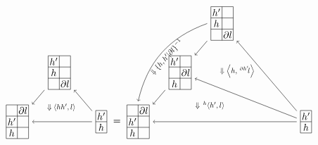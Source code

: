 \documentclass[11pt, reqno]{amsart} %
\newcommand{\act}[1]{\,\sp{#1}\!}
\newcommand{\strsquare}[4][]{
  \begin{scope}[every node/.append style={overlay},#1]
    \foreach \x [count=\i] in {#4}{
      \ifx\x\empty
      \else
        \pgfmathsetmacro{\modResult}{mod(\i-1, #2)}
        \pgfmathsetmacro{\quotResult}{(\i-\modResult-1)/#2}
        \node at (\modResult,-\quotResult) {\x};
      \fi
    }
    \foreach \x in {0,1,...,#2}{
      \draw ({-1/2+\x},{1/2})--({-1/2+\x},{-#3+1/2});
    }
    \foreach \y in {0,1,...,#3}{
      \draw ({-1/2},{1/2-\y})--({#2-1/2},{1/2-\y});
    }
  \end{scope}
}
\theoremstyle{definition}
\theoremstyle{remark}
\numberwithin{equation}{section}
\begin{document}
\[
  \begin{tikzpicture}[baseline=-2pt]
    \node (A) at (1.5,0) {\tikz[baseline=-2pt,scale=.4]{\strsquare{1}{2}{$h'$,$h$}}};
    \node (B) at (0,1.75) {\tikz[baseline=-2pt,scale=.4]{\strsquare{2}{3}{$h'$,,$h$,,,$\partial l$}}};
    \node (C) at (-1.5,0) {\tikz[baseline=-2pt,scale=.4]{\strsquare{2}{3}{,$\partial l$,$h'$,,$h$,}}};
    \draw [->] (A) to (B);
    \draw [->] (B) to (C);
    \draw [->] (A) to coordinate (D) (C);
    \path (B) to node [transform shape,scale=.75] {$\Downarrow \left<hh',l\right>$} (D);
  \end{tikzpicture}
  =
  \begin{tikzpicture}[baseline=-2pt]
    \node (A) at (3,0) {\tikz[baseline=-2pt,scale=.4]{\strsquare{1}{2}{$h'$,$h$}}};
    \node (B) at (0,3.5) {\tikz[baseline=-2pt,scale=.4]{\strsquare{2}{3}{$h'$,,$h$,,,$\partial l$}}};
    \node (C) at (-1.5,1.75) {\tikz[baseline=-2pt,scale=.4]{\strsquare{2}{3}{$h'$,,,$\partial l$,$h$,}}};
    \node (D) at (-3,0) {\tikz[baseline=-2pt,scale=.4]{\strsquare{2}{3}{,$\partial l$,$h'$,,$h$,}}};
    \draw [->] (A) to (B);
    \draw [->,bend right=1cm] (B.west) to node [transform shape,scale=.75,sloped,anchor=north] {$\Downarrow \{h,h'|\partial l\}^{-1}$} (D.north);
    \draw [->] (B) to (C);
    \draw [->] (C) to (D);
    \draw [->] (A) to coordinate (E) (D);
    \draw [->] (A) to coordinate (F) (C);
    \path (B) to node [transform shape,scale=.75] {$\Downarrow \left<h,\act{\partial h'}l\right>$} (F);
    \path (C) to node [transform shape,scale=.75] {$\Downarrow \act{h}\left<h',l\right>$} (E);
  \end{tikzpicture}
\]
\end{document}
